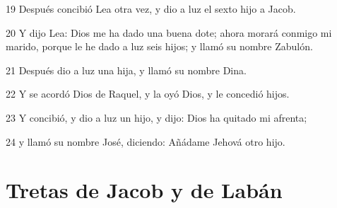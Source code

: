 \par 19 Después concibió Lea otra vez, y dio a luz el sexto hijo a Jacob.
\par 20 Y dijo Lea: Dios me ha dado una buena dote; ahora morará conmigo mi marido, porque le he dado a luz seis hijos; y llamó su nombre Zabulón.
\par 21 Después dio a luz una hija, y llamó su nombre Dina.
\par 22 Y se acordó Dios de Raquel, y la oyó Dios, y le concedió hijos.
\par 23 Y concibió, y dio a luz un hijo, y dijo: Dios ha quitado mi afrenta;
\par 24 y llamó su nombre José, diciendo: Añádame Jehová otro hijo.

\section*{Tretas de Jacob y de Labán}


